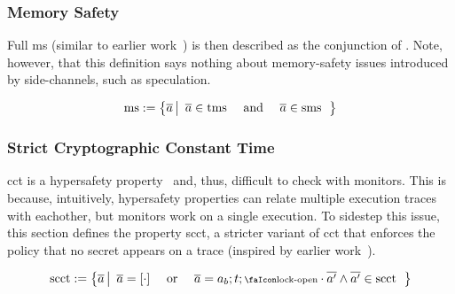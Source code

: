 \documentclass[utf8,acmsmall,review,screen,dvipsnames,anonymous]{acmart}
\begin{document}
\subsubsection{Memory Safety}

Full \gls{ms} (similar to earlier work~\cite{nagarakatte2009soft,nagarakatte2010cets,jim2002cyclone,necula2005ccured,michael2023mswasm}) is then described as the conjunction of .
Note, however, that this definition says nothing about memory-safety issues introduced by side-channels, such as speculation.

\begin{definition}[\glsfirst{ms}]\label{def:trace:msdef}
  $$
  \operatorname{ms}:=\left\{\overline{a} \left|\begin{array}{rcl}
                                 \overline{a}\in\operatorname{tms} & \text{ and } & \overline{a}\in\operatorname{sms}
                               \end{array}\right.\right\}
  $$
\end{definition}

\subsubsection{Strict Cryptographic Constant Time}

\gls{cct} is a hypersafety property~\cite{barthe2018sec} and, thus, difficult to check with monitors.
This is because, intuitively, hypersafety properties can relate multiple execution traces with eachother, but monitors work on a single execution.
To sidestep this issue, this section defines the property \gls{scct}, a stricter variant of \gls{cct} that enforces the policy that no secret appears on a trace (inspired by earlier work~\cite{almeida2017jasmin}).

\begin{definition}\label{def:trace:scctdef}
  $$
  \scctsafe:=\left\{\trace \left|\begin{array}{rcl}
                                   \trace=\hole{\cdot} & \text{ or } & \trace=\event[_{b}];\sandboxtag;\unlock\cdot\trace['] \wedge \trace[']\in\scctsafe
                                 \end{array}\right.\right\}
  $$
\end{definition}
\end{document}
